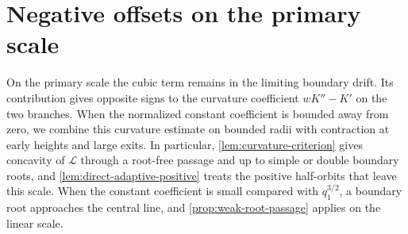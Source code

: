 \section{Negative offsets on the primary scale}
\label{sec:primary-regimes}

On the primary scale the cubic term remains in the limiting boundary
drift. Its contribution gives opposite signs to the curvature
coefficient \(wK''-K'\) on the two branches. When the normalized
constant coefficient is bounded away from zero, we combine this
curvature estimate on bounded radii with contraction at early heights
and large exits. In particular,
\cref{lem:curvature-criterion} gives concavity of \(\mathcal L\)
through a root-free passage and up to simple or double boundary roots, and
\cref{lem:direct-adaptive-positive} treats the positive half-orbits that
leave this scale. When the constant coefficient is small compared with
\(q_1^{3/2}\), a boundary root approaches the central line, and
\cref{prop:weak-root-passage} applies on the linear scale.
